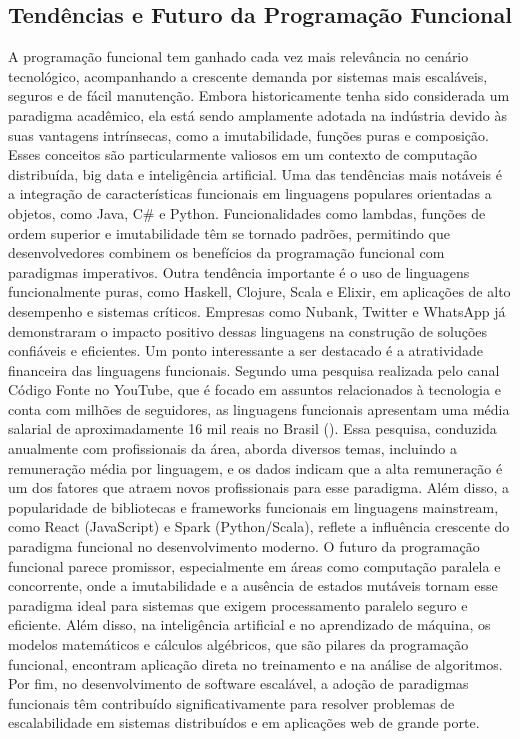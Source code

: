 \subsection{Tendências e Futuro da Programação Funcional}

A programação funcional tem ganhado cada vez mais relevância no cenário tecnológico, acompanhando a crescente demanda por sistemas mais escaláveis, seguros e de fácil manutenção. Embora historicamente tenha sido considerada um paradigma acadêmico, ela está sendo amplamente adotada na indústria devido às suas vantagens intrínsecas, como a imutabilidade, funções puras e composição. Esses conceitos são particularmente valiosos em um contexto de computação distribuída, big data e inteligência artificial.
Uma das tendências mais notáveis é a integração de características funcionais em linguagens populares orientadas a objetos, como Java, C# e Python. Funcionalidades como lambdas, funções de ordem superior e imutabilidade têm se tornado padrões, permitindo que desenvolvedores combinem os benefícios da programação funcional com paradigmas imperativos.
Outra tendência importante é o uso de linguagens funcionalmente puras, como Haskell, Clojure, Scala e Elixir, em aplicações de alto desempenho e sistemas críticos. Empresas como Nubank, Twitter e WhatsApp já demonstraram o impacto positivo dessas linguagens na construção de soluções confiáveis e eficientes. Um ponto interessante a ser destacado é a atratividade financeira das linguagens funcionais. Segundo uma pesquisa realizada pelo canal Código Fonte no YouTube, que é focado em assuntos relacionados à tecnologia e conta com milhões de seguidores, as linguagens funcionais apresentam uma média salarial de aproximadamente 16 mil reais no Brasil (). Essa pesquisa, conduzida anualmente com profissionais da área, aborda diversos temas, incluindo a remuneração média por linguagem, e os dados indicam que a alta remuneração é um dos fatores que atraem novos profissionais para esse paradigma. Além disso, a popularidade de bibliotecas e frameworks funcionais em linguagens mainstream, como React (JavaScript) e Spark (Python/Scala), reflete a influência crescente do paradigma funcional no desenvolvimento moderno. O futuro da programação funcional parece promissor, especialmente em áreas como computação paralela e concorrente, onde a imutabilidade e a ausência de estados mutáveis tornam esse paradigma ideal para sistemas que exigem processamento paralelo seguro e eficiente. Além disso, na inteligência artificial e no aprendizado de máquina, os modelos matemáticos e cálculos algébricos, que são pilares da programação funcional, encontram aplicação direta no treinamento e na análise de algoritmos. Por fim, no desenvolvimento de software escalável, a adoção de paradigmas funcionais têm contribuído significativamente para resolver problemas de escalabilidade em sistemas distribuídos e em aplicações web de grande porte.
